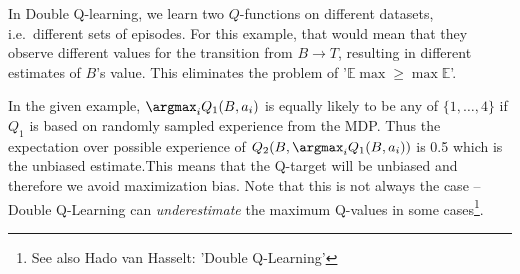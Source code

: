 \documentclass{article}
\begin{document}
In Double Q-learning, we learn two $Q$-functions on different datasets, i.e.\ different sets of episodes. For this example, that would mean that they observe different values for the transition from $B\to T$, resulting in different estimates of $B$'s value. This eliminates the problem of '\(\mathbb{E}\max \geq \max \mathbb{E}\)'.

In the given example, \(\argmax_i Q_1(B, a_i)\) is equally likely to be any of \(\{1, \ldots, 4\}\) if \(Q_1\) is based on randomly sampled experience from the MDP. Thus the expectation over possible experience of \(Q_2(B, \argmax_i Q_1(B, a_i))\) is 0.5 which is the unbiased estimate.This means that the Q-target will be unbiased and therefore we avoid maximization bias. Note that this is not always the case -- Double Q-Learning can \emph{underestimate} the maximum Q-values in some cases\footnote{See also {Hado van Hasselt: 'Double Q-Learning'}}.

 
\end{document}
